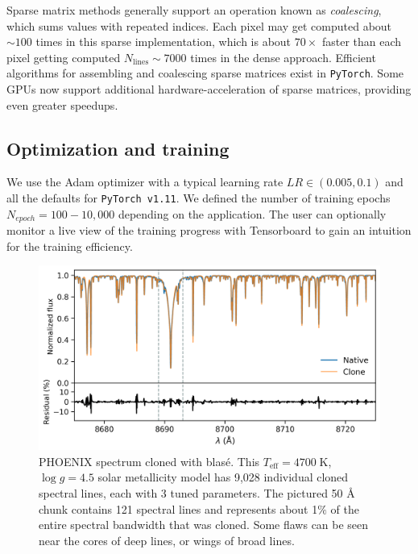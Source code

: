 \documentclass[twocolumn]{aastex631}
\begin{document}
Sparse matrix methods generally support an operation known as \emph{coalescing}, which sums values with repeated indices. Each pixel may get computed about $\sim100$ times in this sparse implementation, which is about $70\times$ faster than each pixel getting computed $N_\mathrm{lines}\sim7000$ times in the dense approach.  Efficient algorithms for assembling and coalescing sparse matrices exist in \texttt{PyTorch}.  Some GPUs now support additional hardware-acceleration of sparse matrices, providing even greater speedups.



\subsection{Optimization and training}

We use the Adam optimizer \citep{2014arXiv1412.6980K} with a typical learning rate $LR\in (0.005, 0.1)$ and all the defaults for \texttt{PyTorch v1.11}.  We defined the number of training epochs $N_{epoch}=100-10,000$ depending on the application. The user can optionally monitor a live view of the training progress with Tensorboard \citep{tensorflow2015-whitepaper} to gain an intuition for the training efficiency.


\begin{figure}[hbt!]
    \centering
    \includegraphics[width=1.0\columnwidth]{figures/blase_clone_demo.png}
    \caption{PHOENIX spectrum cloned with blas\'e.  This $T_{\mathrm{eff}}=4700\;$K,  $\log{g}=4.5$ solar metallicity model has 9,028 individual cloned spectral lines, each with 3 tuned parameters.  The pictured 50 \AA~ chunk contains 121 spectral lines and represents about 1$\%$ of the entire spectral bandwidth that was cloned.  Some flaws can be seen near the cores of deep lines, or wings of broad lines.}
    \label{fig_cloned_spectrum_demo}
\end{figure}
\end{document}
